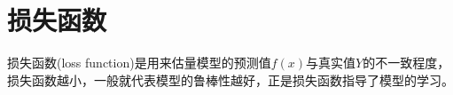 \chapter{损失函数}
损失函数(loss function)是用来估量模型的预测值$f(x)$与真实值$Y$的不一致程度，损失函数越小，一般就代表模型的鲁棒性越好，正是损失函数指导了模型的学习。